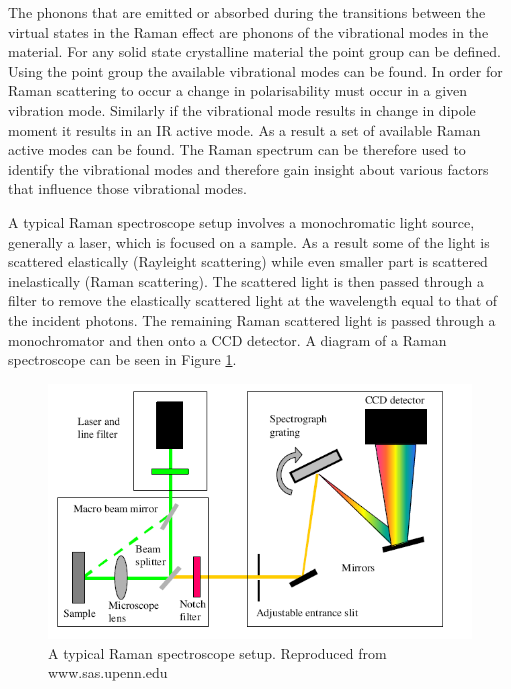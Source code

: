 The phonons that are emitted or absorbed during the transitions between the virtual states in the Raman effect are phonons of the vibrational modes in the material. For any solid state crystalline material the point group can be defined. Using the point group the available vibrational modes can be found. In order for Raman scattering to occur a change in polarisability must occur in a given vibration mode. Similarly if the vibrational mode results in change in dipole moment it results in an IR active mode. As a result a set of available Raman active modes can be found. The Raman spectrum can be therefore used to identify the vibrational modes and therefore gain insight about various factors that influence those vibrational modes.

A typical Raman spectroscope setup involves a monochromatic light source, generally a laser, which is focused on a sample. As a result some of the light is scattered elastically (Rayleight scattering) while even smaller part is scattered inelastically (Raman scattering). The scattered light is then passed through a filter to remove the elastically scattered light at the wavelength equal to that of the incident photons. The remaining Raman scattered light is passed through a monochromator and then onto a CCD detector. A diagram of a Raman spectroscope can be seen in Figure \ref{fig:MethodologyRamanSetup}.

\begin{figure}[!h]
	\begin{center}
		\includegraphics[scale=0.7]{Methodology/RamanSetup.png}
		\caption{A typical Raman spectroscope setup. Reproduced from www.sas.upenn.edu}
		\label{fig:MethodologyRamanSetup}
	\end{center}
\end{figure}

